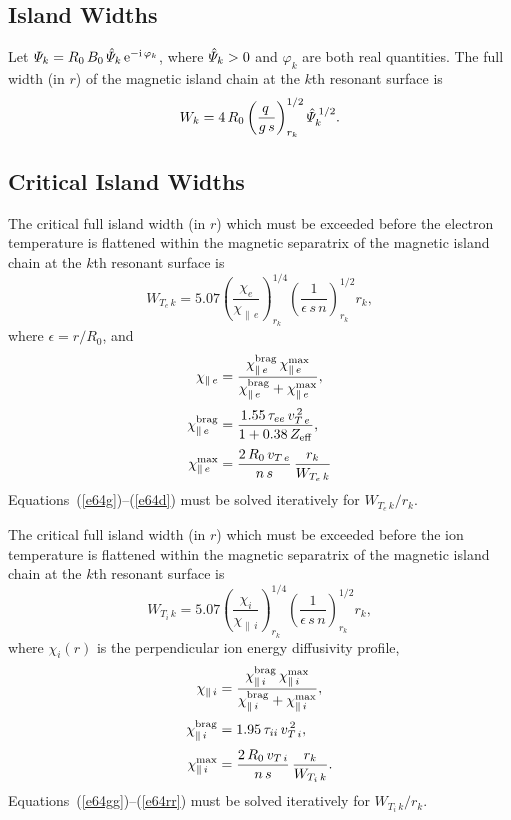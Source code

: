 \documentclass[notitlepage,12pt]{article}
\begin{document}
\subsection{Island Widths}
Let ${\mit\Psi}_k= R_0\,B_0\,\hat{\mit\Psi}_k\,{\rm e}^{-{\rm i}\,\varphi_k}$, where $\hat{\mit\Psi}_k>0$  and $\varphi_k$ are both real quantities.
The full width (in $r$) of the magnetic island chain at the
$k$th resonant surface is
\begin{equation}
W_k = 4\,R_0\left(\frac{q\,}{g\,s}\right)^{1/2}_{r_k}\hat{\mit\Psi}_k^{\,1/2}.
\end{equation}

\subsection{Critical Island Widths}
The critical full island width (in $r$) which must be exceeded before the electron temperature is flattened within the
magnetic separatrix of the magnetic island chain at the $k$th resonant surface is
\begin{equation}\label{e64g}
W_{T_e\,k} = 5.07\left(\frac{\chi_e}{\chi_{\parallel\,e}}\right)^{1/4}_{r_k}\left(\frac{1}{\epsilon\,s\,n}\right)^{1/2}_{r_k}r_k,
\end{equation}
where $\epsilon =r/R_0$, and 
\begin{align}
\chi_{\parallel\,e}&= \frac{\chi_{\parallel\,e}^{\rm brag}\,\chi_{\parallel\,e}^{\rm max}}{\chi_{\parallel\,e}^{\rm brag}+\chi_{\parallel\,e}^{\rm max}},\\[0.5ex]
\chi_{\parallel\,e}^{\rm brag} &= \frac{1.55\,\tau_{ee}\,v_{T\,e}^{\,2}}{1+0.38\,Z_{\rm eff}},\\[0.5ex]
\chi_{\parallel\,e}^{\rm max} &= \frac{2\,R_0\,v_{T\,e}}{n\,s}\,\frac{r_k}{W_{T_e\,k}}\label{e64d}
\end{align}
Equations~(\ref{e64g})--(\ref{e64d}) must be solved iteratively for $W_{T_e\,k}/r_k$. 

The critical full island width (in $r$) which must be exceeded before the ion temperature is flattened within the
magnetic separatrix of the magnetic island chain at the $k$th resonant surface is
\begin{equation}\label{e64gg}
W_{T_i\,k}= 5.07\left(\frac{\chi_i}{\chi_{\parallel\,i}}\right)^{1/4}_{r_k}\left(\frac{1}{\epsilon\,s\,n}\right)^{1/2}_{r_k}r_k,
\end{equation}
where $\chi_i(r)$ is the perpendicular ion energy diffusivity profile, 
\begin{align}
\chi_{\parallel\,i}&= \frac{\chi_{\parallel\,i}^{\rm brag}\,\chi_{\parallel\,i}^{\rm max}}{\chi_{\parallel\,i}^{\rm brag}+\chi_{\parallel\,i}^{\rm max}},\\[0.5ex]
\chi_{\parallel\,i}^{\rm brag} &= 1.95\,\tau_{ii}\,v_{T\,i}^{\,2},\\[0.5ex]
\chi_{\parallel\,i}^{\rm max} &= \frac{2\,R_0\,v_{T\,i}}{n\,s}\,\frac{r_k}{W_{T_i\,k}}.\label{e64rr}
\end{align}
Equations~(\ref{e64gg})--(\ref{e64rr}) must be solved iteratively for $W_{T_i\,k}/r_k$.
\end{document}
